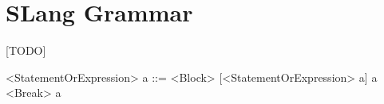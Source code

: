 \section{SLang Grammar}
\label{app:slang grammar}

\setlength{\grammarparsep}{20pt plus 1pt minus 1pt} %
\setlength{\grammarindent}{12em} %
[TODO] \newline
\begin{grammar}
	<StatementOrExpression> a ::=	<Block> [<StatementOrExpression> a] a
	\alt  <Break> a
\end{grammar}
